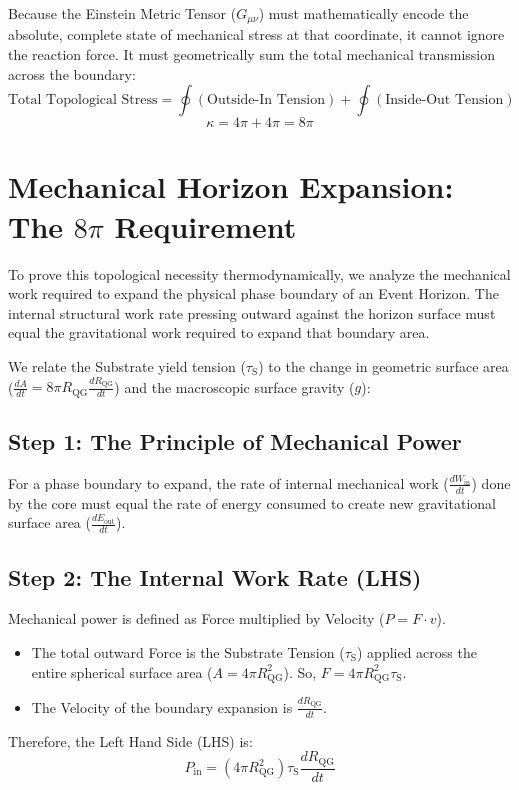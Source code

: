 Because the Einstein Metric Tensor ($G_{\mu\nu}$) must mathematically encode the absolute, complete state of mechanical stress at that coordinate, it cannot ignore the reaction force. It must geometrically sum the total mechanical transmission across the boundary:
\begin{equation}
    \text{Total Topological Stress} = \oint (\text{Outside-In Tension}) + \oint (\text{Inside-Out Tension})
\end{equation}
\begin{equation}
    \kappa = 4\pi + 4\pi = 8\pi
\end{equation}

\section{Mechanical Horizon Expansion: The $8\pi$ Requirement}
To prove this topological necessity thermodynamically, we analyze the mechanical work required to expand the physical phase boundary of an Event Horizon. The internal structural work rate pressing outward against the horizon surface must equal the gravitational work required to expand that boundary area. 

We relate the Substrate yield tension ($\tau_{\mathrm{S}}$) to the change in geometric surface area ($\frac{dA}{dt} = 8\pi R_{\mathrm{QG}} \frac{dR_{\mathrm{QG}}}{dt}$) and the macroscopic surface gravity ($g$):

\subsection*{Step 1: The Principle of Mechanical Power}
For a phase boundary to expand, the rate of internal mechanical work ($\frac{dW_{\mathrm{in}}}{dt}$) done by the core must equal the rate of energy consumed to create new gravitational surface area ($\frac{dE_{\mathrm{out}}}{dt}$).

\subsection*{Step 2: The Internal Work Rate (LHS)}
Mechanical power is defined as Force multiplied by Velocity ($P = F \cdot v$).
\begin{itemize}
    \item The total outward Force is the Substrate Tension ($\tau_{\mathrm{S}}$) applied across the entire spherical surface area ($A = 4\pi R_{\mathrm{QG}}^2$). So, $F = 4\pi R_{\mathrm{QG}}^2 \tau_{\mathrm{S}}$.
    \item The Velocity of the boundary expansion is $\frac{dR_{\mathrm{QG}}}{dt}$.
\end{itemize}
Therefore, the Left Hand Side (LHS) is:
\begin{equation}
    P_{\mathrm{in}} = (4\pi R_{\mathrm{QG}}^2) \tau_{\mathrm{S}} \frac{dR_{\mathrm{QG}}}{dt}
\end{equation}

